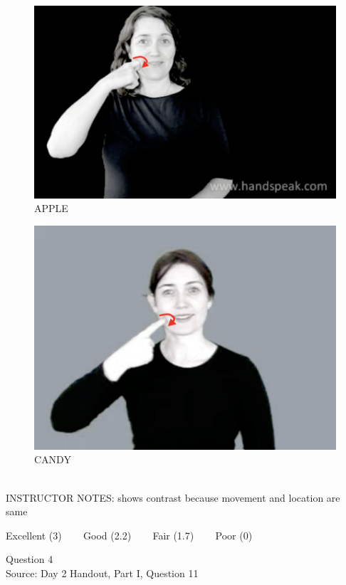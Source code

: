 \documentclass[12pt]{article}
\begin{document}
\begin{figure}[H]
\includegraphics{../images/asl_apple.png}
\caption{APPLE}
\end{figure}
\begin{figure}[H]
\includegraphics{../images/asl_candy.png}
\caption{CANDY}
\end{figure}

~\\
INSTRUCTOR NOTES: shows contrast because movement and location are same


\vfill
Excellent (3) ~~~ Good (2.2) ~~~ Fair (1.7) ~~~ Poor (0)
\newpage

{\large Question 4}\\

Source: Day 2 Handout, Part I, Question 11\\
\end{document}
